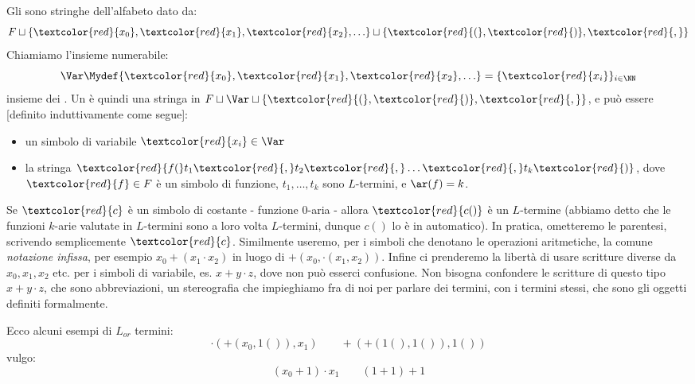 \begin{definition}
    [$L$-termine]
    Gli  sono stringhe dell'alfabeto dato da:
    \[ F \sqcup \{\textcolor{red}{x_0},\textcolor{red}{x_1},\textcolor{red}{x_2}, \ldots\} \sqcup \{\textcolor{red}{(}, \textcolor{red}{)}, \textcolor{red}{,}\}
    \]
    Chiamiamo l'insieme numerabile:
    \[ \Var \Mydef \{\textcolor{red}{x_0},\textcolor{red}{x_1},\textcolor{red}{x_2}, \ldots\} = \{\textcolor{red}{x_i}\}_{i \in \NN}
    \]
    insieme dei . Un  è quindi una stringa in $F \sqcup \Var \sqcup \{\textcolor{red}{(}, \textcolor{red}{)}, \textcolor{red}{,}\}$, e può essere [definito induttivamente come segue]:
    \begin{itemize}
        \item un simbolo di variabile $\textcolor{red}{x_i} \in \Var$
        \item la stringa $\textcolor{red}{f(}t_1\textcolor{red}{,}t_2\textcolor{red}{,} \ldots\textcolor{red}{,} t_k\textcolor{red}{)}$, dove $\textcolor{red}{f} \in F$ è un simbolo di funzione, $t_1,\ldots,t_k$ sono $L$-termini, e $\ar(f) = k$.
    \end{itemize}
\end{definition}

\begin{remark}
    Se $\textcolor{red}{c}$ è un simbolo di costante - funzione 0-aria - allora $\textcolor{red}{c()}$ è un $L$-termine (abbiamo detto che le funzioni $k$-arie valutate in $L$-termini sono a loro volta $L$-termini, dunque $c()$ lo è in automatico).
    In pratica, ometteremo le parentesi, scrivendo semplicemente $\textcolor{red}{c}$.
    Similmente useremo, per i simboli che denotano le operazioni aritmetiche, la comune \emph{notazione infissa}, per esempio $x_0 + (x_1 \cdot x_2)$ in luogo di $+(x_0, \cdot(x_1,x_2))$.
    Infine ci prenderemo la libertà di usare scritture diverse da $x_0,x_1,x_2$ etc. per i simboli di variabile, es. $x+y\cdot z$, dove non può esserci confusione.
    Non bisogna confondere le scritture di questo tipo $x+y\cdot z$, che sono abbreviazioni, un stereografia che impieghiamo fra di noi per parlare dei termini, con i termini stessi, che sono gli oggetti definiti formalmente.
\end{remark}

\begin{example}
    Ecco alcuni esempi di $L_{or}$ termini:
    \[ \cdot(+(x_0,1()),x_1) \qquad +(+(1(),1()),1())
    \]
    vulgo:
    \[ (x_0 + 1) \cdot x_1 \qquad (1 + 1) + 1
    \]
\end{example}

